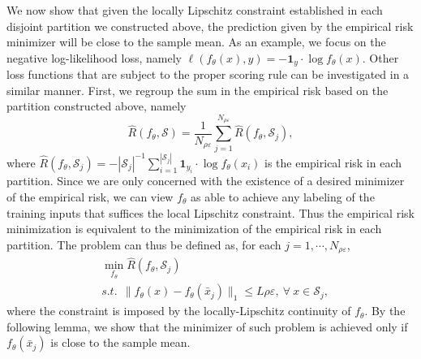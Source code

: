\vspace{1em}
We now show that given the locally Lipschitz constraint established in each disjoint partition we constructed above, the prediction given by the empirical risk minimizer will be close to the sample mean. As an example, we focus on the negative log-likelihood loss, namely $\ell(f_\theta(x), y) = - \mathbf{1}_y \cdot \log f_\theta (x) $. Other loss functions that are subject to the proper scoring rule can be investigated in a similar manner.
First, we regroup the sum in the empirical risk based on the partition constructed above, namely
\begin{equation}
    \hat{R}(f_\theta, \mathcal{S}) = \frac{1}{N_{\rho\varepsilon}}\sum_{j=1}^{N_{\rho\varepsilon}} \hat{R} (f_\theta, \mathcal{S}_j),
\end{equation}
where $\hat{R} (f_\theta, \mathcal{S}_j) = -{|\mathcal{S}_j|}^{-1} \sum_{i=1}^{|\mathcal{S}_j|} \mathbf{1}_{y_i} \cdot \log f_\theta(x_i)$ is the empirical risk in each partition. Since we are only concerned with the existence of a desired minimizer of the empirical risk, we can view $f_\theta$ as able to achieve any labeling of the training inputs that suffices the local Lipschitz constraint. 
Thus the empirical risk minimization is equivalent to the minimization of the empirical risk in each partition.
The problem can thus be defined as, for each $j = 1, \cdots, N_{\rho\varepsilon}$,
\begin{equation}
\label{eq:minimum-partition}
\begin{aligned}
& \min_{f_\theta} \hat{R} (f_\theta, \mathcal{S}_j)\\
& s.t.~~ \|f_\theta(x) - f_\theta(\bar{x}_j)\|_1 \le L\rho\varepsilon, 
~\forall~x \in \mathcal{S}_j,
\end{aligned}
\end{equation}
where the constraint is imposed by the locally-Lipschitz continuity of $f_\theta$. By the following lemma, we show that the minimizer of such problem is achieved only if $f_\theta(\bar{x}_j)$ is close to the sample mean.

